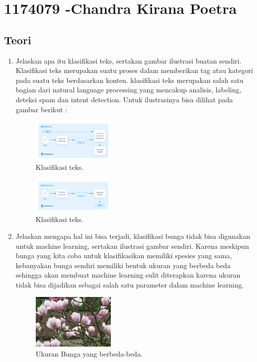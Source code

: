 \section{1174079 -Chandra Kirana Poetra}
\subsection{Teori}
\begin{enumerate}

	\item Jelaskan apa itu klasifikasi teks, sertakan gambar ilustrasi buatan sendiri.
	\hfill\break
	Klasifikasi teks merupakan suatu proses dalam memberikan tag atau kategori pada suatu teks berdasarkan konten. klasifikasi teks merupakan salah satu bagian dari natural language processing yang mencakup analisis, labeling, deteksi spam dan intent detection. Untuk ilustrasinya bisa dilihat pada gambar berikut : 

	\begin{figure}[H]
	\centering
		\includegraphics[width=4cm]{figures/1174079/4/klasifikasiteks1.png}
		\caption{Klasifikasi teks.}
	\end{figure}
	\begin{figure}[H]
	\centering
		\includegraphics[width=4cm]{figures/1174079/4/klasifikasiteks2.png}
		\caption{Klasifikasi teks.}
	\end{figure}

	\item Jelaskan mengapa hal ini bisa terjadi, klasifikasi bunga tidak bisa digunakan untuk machine learning, sertakan ilustrasi gambar sendiri.
	\hfill\break
	Karena meskipun bunga yang kita coba untuk klasifikasikan memiliki spesies yang sama, kebanyakan bunga sendiri memiliki bentuk ukuran yang berbeda beda sehingga akan membuat machine learning sulit diterapkan karena ukuran tidak bisa dijadikan sebagai salah satu parameter dalam machine learning.
\begin{figure}[H]
	\centering
		\includegraphics[width=4cm]{figures/1174079/4/bentukbunga.jpg}
		\caption{Ukuran Bunga yang berbeda-beda.}
	\end{figure}
	

\end{enumerate}
